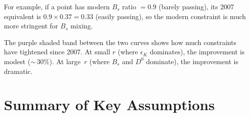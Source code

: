 \documentclass[11pt]{article}
\begin{document}
For example, if a point has modern $B_s$ ratio $= 0.9$ (barely passing), its
2007 equivalent is $0.9\times0.37 = 0.33$ (easily passing), so the modern
constraint is much more stringent for $B_s$ mixing.

The purple shaded band between the two curves shows how much constraints have
tightened since 2007.  At small $r$ (where $\epsilon_K$ dominates), the
improvement is modest (${\sim}\,30\%$).  At large~$r$ (where $B_s$ and $D^0$
dominate), the improvement is dramatic.

\section{Summary of Key Assumptions}
\label{sec:summary}
\end{document}
